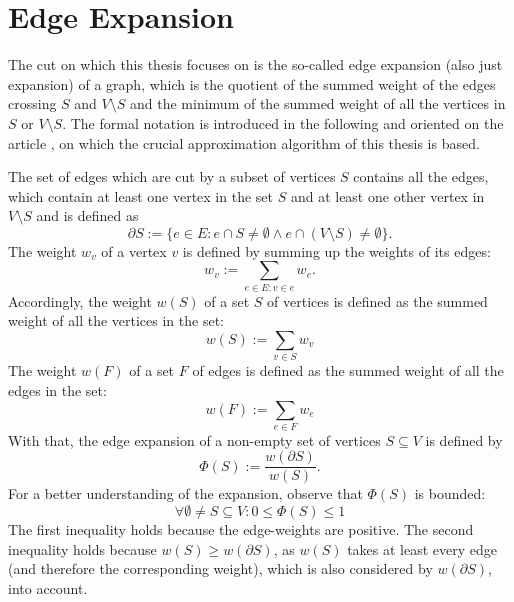 \section{Edge Expansion}
The cut on which this thesis focuses on is the so-called edge expansion (also just expansion) of a graph, which is the quotient of the summed weight of the edges crossing $S$ and $V\setminus S$ and the minimum of the summed weight of all the vertices in $S$ or $V\setminus S$. The formal notation is introduced in the following and oriented on the article \cite{ChanLTZ16}, on which the crucial approximation algorithm of this thesis is based.

The set of edges which are cut by a subset of vertices $S$ contains all the edges, which contain at least one vertex in the set $S$ and at least one other vertex in $V\setminus S$ and is defined as \begin{equation}
\partial S:= \{e\in E : e \cap S \neq \emptyset \land  e \cap (V \setminus S) \neq \emptyset  \}.
\end{equation} 
The weight $w_v$ of a vertex $v$ is defined by summing up the weights of its edges: \begin{equation}
w_v := \sum_{e\in E: v\in e} w_e.
\end{equation} %
Accordingly, the weight $w(S)$ of a set $S$ of vertices is defined as the summed weight of all the vertices in the set: 
\begin{equation}
	w(S) := \sum_{v\in S} w_v
\end{equation}
The weight $w(F)$ of a set $F$ of edges is defined as the summed weight of all the edges in the set: 
\begin{equation}
w(F) := \sum_{e\in F} w_e
\end{equation}
With that, the edge expansion of a non-empty set of vertices $S \subseteq V$ is defined by \begin{equation}
\Phi(S):= \frac{w(\partial S)}{w(S)}.
\end{equation}
For a better understanding of the expansion, observe that $\Phi(S)$ is bounded: \begin{equation} \label{eq:phi_bounded}
\forall \emptyset \neq S \subseteq V : 0\le \Phi(S) \le 1 
\end{equation} The first inequality holds because the edge-weights are positive. The second inequality holds because $w(S) \ge w(\partial S)$, as $w(S)$ takes at least every edge (and therefore the corresponding weight), which is also considered by $w(\partial S)$, into account.


